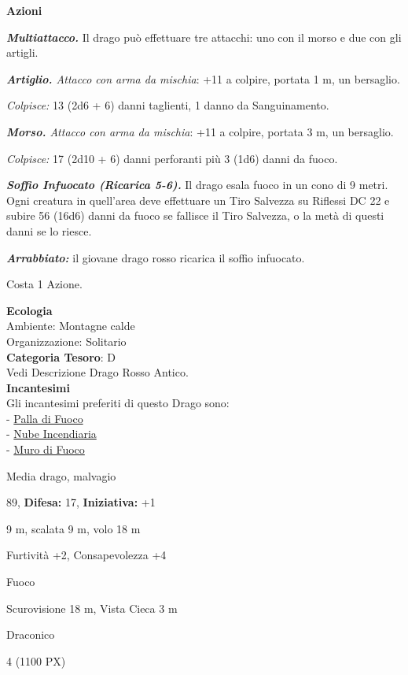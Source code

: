 \begin{multicols}{2}
{\textbf{Azioni}

\emph{\textbf{Multiattacco.}} Il drago può effettuare tre attacchi: uno con il morso e due con gli artigli.

\emph{\textbf{Artiglio.} Attacco con arma da mischia}: +11 a colpire, portata 1 m, un bersaglio.

\emph{Colpisce:} 13 (2d6 + 6) danni taglienti, 1 danno da Sanguinamento.

\emph{\textbf{Morso.} Attacco con arma da mischia}: +11 a colpire, portata 3 m, un bersaglio.

\emph{Colpisce:} 17 (2d10 + 6) danni perforanti più 3 (1d6) danni da fuoco.

\emph{\textbf{Soffio Infuocato (Ricarica 5-6).}} Il drago esala fuoco in un cono di 9 metri. Ogni creatura in quell'area deve effettuare un Tiro Salvezza su Riflessi DC 22 e subire 56 (16d6) danni da fuoco se fallisce il Tiro Salvezza, o la metà di questi danni se lo riesce.

\emph{\textbf{Arrabbiato:}} il giovane drago rosso ricarica il soffio infuocato.

Costa 1 Azione.

\textbf{Ecologia}\\
Ambiente: Montagne calde\\
Organizzazione: Solitario\\
\textbf{Categoria Tesoro}: D\\
Vedi Descrizione Drago Rosso Antico.\\
\textbf{Incantesimi}\\
Gli incantesimi preferiti di questo Drago sono:\\
- \hyperlink{Palla di Fuoco}{Palla di Fuoco}\\
- \hyperlink{Nube Incendiaria}{Nube Incendiaria}\\
- \hyperlink{Muro di Fuoco}{Muro di Fuoco}

\noindent
\begin{description}[noitemsep, topsep=0pt, parsep=0pt, partopsep=0pt, leftmargin=0cm, labelwidth=2.2cm]
	\item[\textbf{Taglia/Tipo:}] Media drago, malvagio
	\item[\textbf{Caratt.:}] 
	\item[\textbf{Punti Ferita:}] 89,  \textbf{Difesa:} 17,  \textbf{Iniziativa:} +1
	\item[\textbf{Movimento:}] 9 m, scalata 9 m, volo 18 m
	\item[\textbf{Tiri Salvez.:}] 
	\item[\textbf{Comp.:}] Furtività +2, Consapevolezza +4
	\item[\textbf{Imm. Danni:}] Fuoco
	\item[\textbf{Sensi:}] Scurovisione 18 m, Vista Cieca 3 m
	\item[\textbf{Linguaggi:}] Draconico
	\item[\textbf{Sfida:}] 4 (1100 PX)\smallskip
\end{description}

}
\end{multicols}
